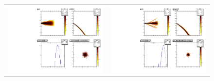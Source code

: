 \documentclass [11pt,a4paper,dvipdfmx] {jarticle}
\begin{document}
\begin{figure}[H]
    \begin{center}
    \begin{tabular}{c c}
        
        \begin{minipage}{0.45\linewidth}   
            \begin{center}
            \includegraphics[width=\linewidth]{./pic/TrackSrim.pdf}
            \end{center}
        \end{minipage}
        &
        \begin{minipage}{0.45\linewidth}   
            \begin{center}
            \includegraphics[width=\linewidth]{./pic/TrackTrimSQLite.pdf}
            \end{center}

\end{minipage}
\end{tabular}
\end{center}
\end{figure}
\end{document}
